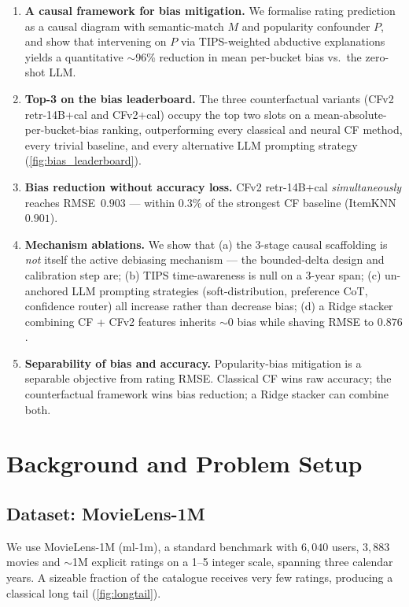 \documentclass[11pt,a4paper]{article}
\begin{document}
\begin{enumerate}[leftmargin=1.8em,itemsep=2pt]
\item \textbf{A causal framework for bias mitigation.} We formalise
      rating prediction as a causal diagram with semantic-match $M$ and
      popularity confounder $P$, and show that intervening on $P$ via
      TIPS-weighted abductive explanations yields a quantitative
      $\sim$96\% reduction in mean per-bucket bias vs.\ the zero-shot
      LLM.
\item \textbf{Top-3 on the bias leaderboard.} The three counterfactual
      variants (CFv2 retr-14B+cal and CFv2+cal) occupy
      the top two slots on a mean-absolute-per-bucket-bias ranking,
      outperforming every classical and neural CF method, every trivial
      baseline, and every alternative LLM prompting strategy
      (\cref{fig:bias_leaderboard}).
\item \textbf{Bias reduction without accuracy loss.} CFv2 retr-14B+cal
      \emph{simultaneously} reaches RMSE~$0.903$ --- within $0.3\%$ of
      the strongest CF baseline (ItemKNN $0.901$).
\item \textbf{Mechanism ablations.} We show that (a) the 3-stage causal
      scaffolding is \emph{not} itself the active debiasing mechanism
      --- the bounded-delta design and calibration step are; (b) TIPS
      time-awareness is null on a 3-year span; (c) un-anchored LLM
      prompting strategies (soft-distribution, preference CoT,
      confidence router) all increase rather than decrease bias; (d) a
      Ridge stacker combining CF + CFv2 features inherits $\sim$$0$ bias
      while shaving RMSE to $0.876$.
\item \textbf{Separability of bias and accuracy.} Popularity-bias
      mitigation is a separable objective from rating RMSE. Classical
      CF wins raw accuracy; the counterfactual framework wins bias
      reduction; a Ridge stacker can combine both.
\end{enumerate}

\section{Background and Problem Setup}

\subsection{Dataset: MovieLens-1M}
We use MovieLens-1M (ml-1m), a standard benchmark with $6{,}040$ users,
$3{,}883$ movies and $\sim$1M explicit ratings on a 1--5 integer scale, spanning
three calendar years. A sizeable fraction of the catalogue receives very few
ratings, producing a classical long tail
(\cref{fig:longtail}).
\end{document}

